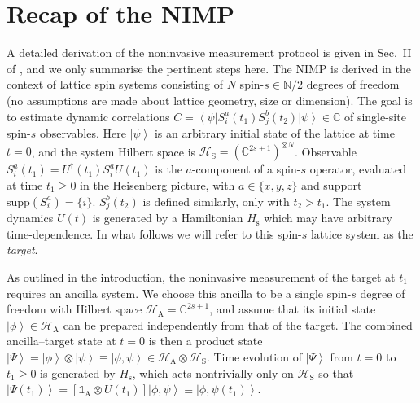 \documentclass[epjST,numbook]{svjour}
\newcommand\NN{{\mathds{N}}}
\newcommand\CC{{\mathds{C}}}
\newcommand{\ket}[1]{\left \vert #1 \right >}
\newcommand{\matel}[3]{ \displaystyle \left\langle #1 \right \vert #2 \left\vert  #3 \right\rangle }
\begin{document}
\section{Recap of the NIMP}
\label{sec:recap}

A detailed derivation of the noninvasive measurement protocol is given in Sec.~II of \cite{Uhrich_etal}, and we only summarise the pertinent steps here. The NIMP is derived in the context of lattice spin systems consisting of $N$ spin-$s\in\NN/2$ degrees of freedom (no assumptions are made about lattice geometry, size or dimension). The goal is to estimate dynamic correlations $C=\matel{\psi}{S_i^a(t_1)S_j^b(t_2)}{\psi} \in \CC$ of single-site spin-$s$ observables. Here $\ket{\psi}$ is an arbitrary initial state of the lattice at time $t=0$, and the system Hilbert space is $\mathscr{H}_\text{S} = (\CC^{2s+1})^{\otimes N}$. Observable $S_i^a(t_1)=U^\dagger(t_1)S_i^a U(t_1)$ is the $a$-component of a spin-$s$ operator, evaluated at time $t_1\geq 0$ in the Heisenberg picture, with $a\in\{x,y,z\}$ and support $\text{supp}(S_i^a)=\{i\}$. $S_j^b(t_2)$ is defined similarly, only with $t_2>t_1$. The system dynamics $U(t)$ is generated by a Hamiltonian $H_\text{s}$ which may have arbitrary time-dependence.
In what follows we will refer to this spin-$s$ lattice system as the \emph{target}.

As outlined in the introduction, the noninvasive measurement of the target at $t_1$ requires an ancilla system. We choose this ancilla to be a single spin-$s$ degree of freedom with Hilbert space $\mathscr{H}_\text{A}=\CC^{2s+1}$, and assume that its initial state $\ket{\phi}\in\mathscr{H}_\text{A}$ can be prepared independently from that of the target. The combined ancilla--target state at $t=0$ is then a product state
$\ket{\Psi}=\ket{\phi}\otimes\ket{\psi}\equiv\ket{\phi,\psi} \in \mathscr{H}_\text{A} \otimes \mathscr{H}_\text{S}$. Time evolution of $\ket{\Psi}$ from $t=0$ to $t_1\geq 0$ is generated by $H_\text{s}$, which acts nontrivially only on $\mathscr{H}_\text{S}$ so that $\ket{\Psi(t_1)}=[\mathds{1}_\text{A} \otimes U(t_1)]\ket{\phi,\psi} \equiv \ket{\phi,\psi(t_1)}$.
\end{document}
